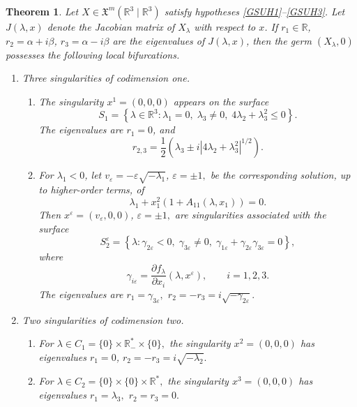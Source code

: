 \documentclass[10pt,a4paper]{amsart}
\newtheorem{theorem}{Theorem}
\begin{document}
\begin{theorem}
	Let $X\in \mathfrak{X}^{m}(\mathbb{R}^{3}\mid \mathbb{R}^{3})$
	satisfy hypotheses \eqref{GSUH1}--\eqref{GSUH3}. Let
	$J(\lambda,x)$ denote the Jacobian matrix of $X_\lambda$ with respect to
	$x$. If $r_1\in \mathbb{R}$, $r_2=\alpha+i\beta$, $r_3=\alpha-i\beta$
	are the eigenvalues of $J(\lambda,x)$, then the germ
	$(X_\lambda,0)$ possesses the following local bifurcations.
	
	\begin{enumerate}
		\item Three singularities of codimension one.
		
		\begin{enumerate}
			\item The singularity $	x^1=(0,0,0)$
			appears on the surface
			$$
			S_1=
			\left\{
			\lambda\in \mathbb{R}^3:
			\lambda_1=0,\;
			\lambda_3\neq 0,\;
			4\lambda_2+\lambda_3^2\leq 0
			\right\}.
			$$
			The eigenvalues are $r_1=0$,	and
			$$
			r_{2,3}
			=
			\frac{1}{2}
			\left(
			\lambda_3
			\pm
			i\left|4\lambda_2+\lambda_3^2\right|^{1/2}
			\right).
			$$
			
			\item For $\lambda_1<0$, let $v_\varepsilon	=-\varepsilon\sqrt{-\lambda_1}$, $\varepsilon=\pm 1,$
			be the corresponding solution, up to higher-order terms, of
			$$
			\lambda_1+x_1^2
			\left(
			1+A_{11}(\lambda,x_1)
			\right)=0.
			$$
			Then $x^\varepsilon=(v_\varepsilon,0,0)$, $\varepsilon=\pm 1,$
			are singularities associated with the surface
			$$
			S_2^\varepsilon
			=
			\left\{
			\lambda:
			\gamma_{2\varepsilon}<0,\;
			\gamma_{3\varepsilon}\neq 0,\;
			\gamma_{1\varepsilon}
			+
			\gamma_{2\varepsilon}\gamma_{3\varepsilon}=0
			\right\},
			$$
			where
			$$
			\gamma_{i\varepsilon}
			=
			\frac{\partial f_\lambda}{\partial x_i}
			(\lambda,x^\varepsilon),
			\qquad
			i=1,2,3.
			$$
			The eigenvalues are $r_1=\gamma_{3\varepsilon},$ $r_2=-r_3=i\sqrt{-\gamma_{2\varepsilon}}.$
		\end{enumerate}
		
		\item Two singularities of codimension two.
		
		\begin{enumerate}
			\item For $\lambda\in C_1=\{0\}\times \mathbb{R}_{-}^{\ast}\times \{0\},$
			the singularity $x^2=(0,0,0)$
			has eigenvalues $r_1=0$, $r_2=-r_3=i\sqrt{-\lambda_2}.$
			
			\item For $\lambda\in C_2=\{0\}\times \{0\}\times \mathbb{R}^{\ast},$
			the singularity $x^3=(0,0,0)$ has eigenvalues $r_1=\lambda_3,$ 
			$r_2=r_3=0.$
		\end{enumerate}
	\end{enumerate}
\end{theorem}
\end{document}

